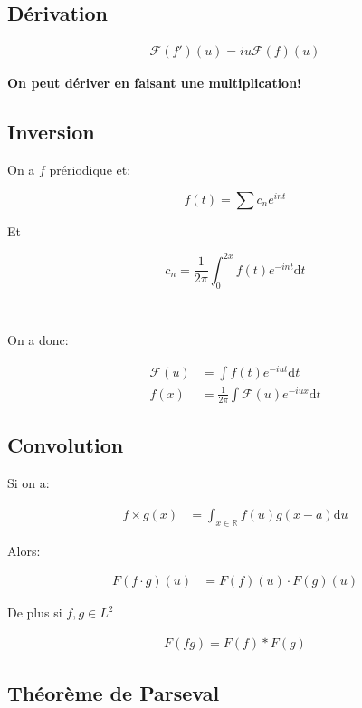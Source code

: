 \documentclass[a4paper,11pt]{article}
\begin{document}
\subsection{Dérivation}
\begin{align*}
  \mathcal{F}(f')(u) = i u \mathcal{F}(f)(u)
\end{align*}

\textbf{On peut dériver en faisant une multiplication!}

\subsection{Inversion}

On a $f$ prériodique et:

$$ f(t) = \sum c_n e^{int}$$

Et

$$ c_n = \frac{1}{2 \pi} \int^{2x}_0 f(t) e ^{-int} \mathrm{d} t $$

\

On a donc:

\begin{align*}
\mathcal{F}(u) &= \int f(t) e^{-iut} \mathrm{d} t \\
  f(x) &= \frac{1}{2 \pi} \int \mathcal{F}(u) e^{-iux} \mathrm{d} t
\end{align*}
\subsection{Convolution}

Si on a:

\begin{align*}
  f \times g(x) &= \int_{x \in \mathbb{R}} f(u) g(x - a) \mathrm{d}u
\end{align*}

Alors:

\begin{align*}
  F(f \cdot g) (u) &= F(f)(u) \cdot F(g)(u)
\end{align*}

De plus si $f,g \in L^2$

\begin{align*}
  F(fg) = F(f) * F(g)
\end{align*}

\subsection{Théorème de Parseval}
\end{document}
